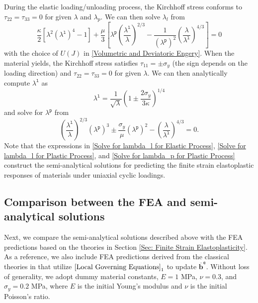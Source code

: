 \documentclass[preprint,11pt]{elsarticle}
\theoremstyle{definition}
\begin{document}
During the elastic loading/unloading process, the Kirchhoff stress conforms to $\tau_{22} = \tau_{33} = 0$ for given $\lambda$ and $\lambda_p$. We can then solve $\lambda_l$ from
\begin{equation} \label{Solve for lambda_l for Elastic Process}
   \dfrac{\kappa}{2} \left[ \lambda^2 (\lambda^\texttt{l})^4-1 \right] + \dfrac{\mu}{3} \left[ \lambda^\texttt{p} \left( \dfrac{\lambda^\texttt{l}}{\lambda} \right)^{2/3} - \dfrac{1}{(\lambda^\texttt{p})^2} \left( \dfrac{\lambda}{\lambda^\texttt{l}} \right)^{4/3}\right] = 0
\end{equation}
with the choice of $U(J)$ in \eqref{Volumetric and Deviatoric Engery}. When the material yields, the Kirchhoff stress satisfies $\tau_{11} = \pm \sigma_y$ (the sign depends on the loading direction) and $\tau_{22} = \tau_{33} = 0$ for given $\lambda$. We can then analytically compute $\lambda^\texttt{l}$ as
\begin{equation} \label{Solve for lambda_l for Plastic Process}
    \lambda^\texttt{l} = \dfrac{1}{\sqrt{\lambda}} \left( 1 \pm \dfrac{2 \sigma_y}{3 \kappa} \right)^{1/4}
\end{equation}
and solve for $\lambda^\texttt{p}$ from
\begin{equation} \label{Solve for lambda_p for Plastic Process}
    \left( \dfrac{\lambda^\texttt{l}}{\lambda} \right)^{2/3} (\lambda^\texttt{p})^3 \pm \dfrac{\sigma_y}{\mu} (\lambda^\texttt{p})^2 - \left( \dfrac{\lambda}{\lambda^\texttt{l}} \right)^{4/3} = 0.
\end{equation}
Note that the expressions in \eqref{Solve for lambda_l for Elastic Process}, \eqref{Solve for lambda_l for Plastic Process}, and \eqref{Solve for lambda_p for Plastic Process} construct the semi-analytical solutions for predicting the finite strain elastoplastic responses of materials under uniaxial cyclic loadings. 

\subsection{Comparison between the FEA and semi-analytical solutions}
\label{Sec: Comparison with Analytical Solution}

Next, we compare the semi-analytical solutions described above with the FEA predictions based on the theories in Section \ref{Sec: Finite Strain Elastoplasticity}. As a reference, we also include FEA predictions derived from the classical theories in \citet{simo_framework_1988-1, simo_framework_1988} that utilize $\eqref{Local Governing Equations}_1$ to update $\overline{\mathbf{b}}^\texttt{e}$. Without loss of generality, we adopt dummy material constants, $E=1$ MPa, $\nu=0.3$, and $\sigma_y=0.2$ MPa, where $E$ is the initial Young's modulus and $\nu$ is the initial Poisson's ratio.
\end{document}
